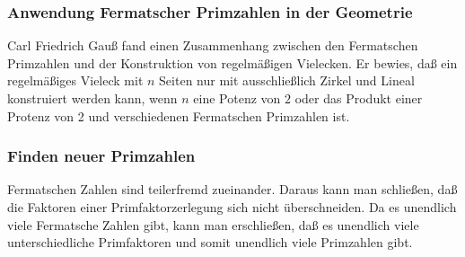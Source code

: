 \subsubsection{Anwendung Fermatscher Primzahlen in der Geometrie}
Carl Friedrich Gauß fand einen Zusammenhang zwischen den Fermatschen Primzahlen und der Konstruktion von regelmäßigen Vielecken. Er bewies, daß ein regelmäßiges Vieleck mit $n$ Seiten nur mit ausschließlich Zirkel und Lineal konstruiert werden kann, wenn $n$ eine Potenz von $2$ oder das Produkt einer Protenz von 2 und verschiedenen Fermatschen Primzahlen ist.
\subsubsection{Finden neuer Primzahlen}
Fermatschen Zahlen sind teilerfremd zueinander. Daraus kann man schließen, daß die Faktoren einer Primfaktorzerlegung sich nicht überschneiden. Da es unendlich viele Fermatsche Zahlen gibt, kann man erschließen, daß es unendlich viele unterschiedliche Primfaktoren und somit unendlich viele Primzahlen gibt.
